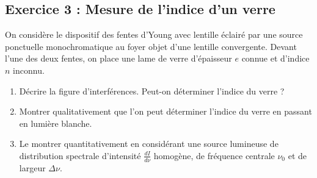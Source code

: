 \subsection{Exercice 3 : Mesure de l'indice d'un verre}

On considère le dispositif des fentes d'Young avec lentille éclairé par une source ponctuelle monochromatique au foyer objet d'une lentille convergente. Devant l'une des deux fentes, on place une lame de verre d'épaisseur $e$ connue et d'indice $n$ inconnu.

\begin{enumerate}
	\item Décrire la figure d'interférences. Peut-on déterminer l'indice du verre ?
	\item Montrer qualitativement que l'on peut déterminer l'indice du verre en passant en lumière blanche.
	\item Le montrer quantitativement en considérant une source lumineuse de distribution spectrale d'intensité $\frac{dI}{d\nu}$ homogène, de fréquence centrale $\nu_0$ et de largeur $\Delta \nu$.
\end{enumerate}
